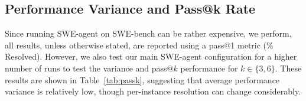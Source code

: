 \subsection{Performance Variance and Pass\texorpdfstring{@}kk Rate}
\label{appx:analyses:pass_at_k}
Since running SWE-agent on SWE-bench can be rather expensive, we perform, all results, unless otherwise stated, are reported using a pass@\num{1} metric (\% Resolved).
However, we also test our main SWE-agent configuration for a higher number of runs to test the variance and pass$@k$ performance for $k\in\{3, 6\}$.
These results are shown in Table~\ref{tab:passk}, suggesting that average performance variance is relatively low, though per-instance resolution can change considerably.

